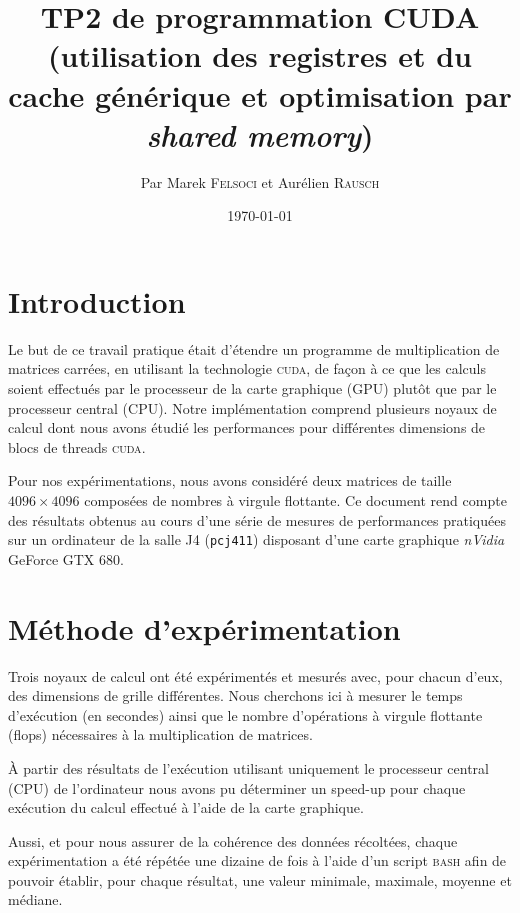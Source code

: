 \documentclass[11pt, twocolumn]{article}
\title{TP2 de programmation CUDA \\ \Large{(utilisation des registres et du cache générique et optimisation par \textit{shared memory})}}
\author{Par Marek \textsc{Felsoci} et Aurélien \textsc{Rausch}}
\date{\today}
\begin{document}
\maketitle

\section*{Introduction}

Le but de ce travail pratique était d'étendre un programme de multiplication de matrices carrées, en utilisant la technologie \textsc{cuda}, de façon à ce que les calculs soient effectués par le processeur de la carte graphique (GPU) plutôt que par le processeur central (CPU). Notre implémentation comprend plusieurs noyaux de calcul dont nous avons étudié les performances pour différentes dimensions de blocs de threads \textsc{cuda}.

\par Pour nos expérimentations, nous avons considéré deux matrices de taille $4096 \times 4096$ composées de nombres à virgule flottante. Ce document rend compte des résultats obtenus au cours d'une série de mesures de performances pratiquées sur un ordinateur de la salle J4 (\texttt{pcj411}) disposant d'une carte graphique \textit{nVidia} GeForce GTX 680.

\section{Méthode d'expérimentation}
\label{section:methode_experimentation}

Trois noyaux de calcul ont été expérimentés et mesurés avec, pour chacun d'eux, des dimensions de grille différentes. Nous cherchons ici à mesurer le temps d'exécution (en secondes) ainsi que le nombre d'opérations à virgule flottante (flops) nécessaires à la multiplication de matrices.

\par À partir des résultats de l'exécution utilisant uniquement le processeur central (CPU) de l'ordinateur nous avons pu déterminer un speed-up pour chaque exécution du calcul effectué à l'aide de la carte graphique.

\par Aussi, et pour nous assurer de la cohérence des données récoltées, chaque expérimentation a été répétée une dizaine de fois à l'aide d'un script \textsc{bash} afin de pouvoir établir, pour chaque résultat, une valeur minimale, maximale, moyenne et médiane.
\end{document}
